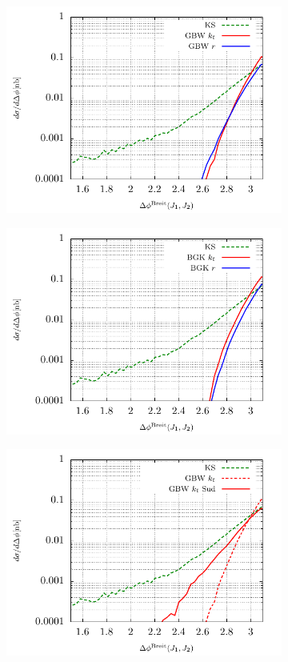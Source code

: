 \documentclass[11pt]{article}
\numberwithin{equation}{section}
\numberwithin{table}{section}
\numberwithin{figure}{section}
\begin{document}
\begin{figure}[p]
	\begin{subfigure}{0.48\textwidth}
		\includegraphics[width=\textwidth]{plots/plotGBW1Jets} 
	\end{subfigure}
	\begin{subfigure}{0.48\textwidth}
		\includegraphics[width=\textwidth]{plots/plotBGK1Jets} 
	\end{subfigure}
	\begin{subfigure}{0.48\textwidth}
		\includegraphics[width=\textwidth]{plots/plotGBW2Jets}

\end{subfigure}
\end{figure}
\end{document}
